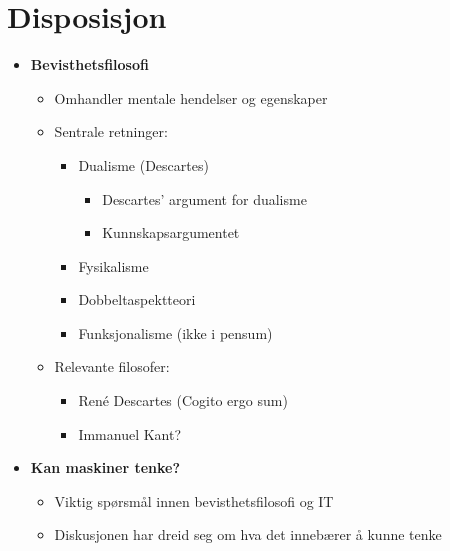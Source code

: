 
\renewcommand{\baselinestretch}{1.5}



\maketitle
\tableofcontents %
\newpage

\section*{Disposisjon}
\begin{itemize}
    \item \textbf{Bevisthetsfilosofi}
          \begin{itemize}
              \item Omhandler mentale hendelser og egenskaper
              \item Sentrale retninger:
                    \begin{itemize}
                        \item Dualisme (Descartes)
                              \begin{itemize}
                                  \item Descartes' argument for dualisme
                                  \item Kunnskapsargumentet
                              \end{itemize}
                        \item Fysikalisme
                        \item Dobbeltaspektteori
                        \item Funksjonalisme (ikke i pensum)
                    \end{itemize}
              \item Relevante filosofer:
                    \begin{itemize}
                        \item René Descartes (Cogito ergo sum)
                        \item Immanuel Kant?
                    \end{itemize}
          \end{itemize}
    \item \textbf{Kan maskiner tenke?}
          \begin{itemize}
              \item Viktig spørsmål innen bevisthetsfilosofi og IT
              \item Diskusjonen har dreid seg om hva det innebærer å kunne tenke

\end{itemize}
\end{itemize}
